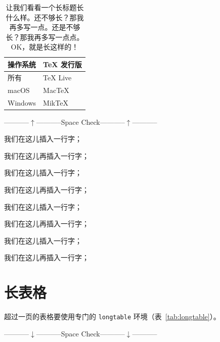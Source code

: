 \begin{table}[!h]
  \centering
  \caption{让我们看看一个长标题长什么样。还不够长？那我再多写一点。还是不够长？那我再多写一点点。OK，就是长这样的！}
  \label{tab:exampletable}
  \begin{tabular}{p{4cm}p{4cm}}
    \toprule
    \multicolumn{1}{c}{\textbf{操作系统}} & \multicolumn{1}{c}{\textbf{TeX 发行版}} \\
    \midrule
    所有 & TeX Live \\
    macOS & MacTeX \\
    Windows & MikTeX \\
    \bottomrule
  \end{tabular}
\end{table}

\centerline{-----------$\uparrow$-----------Space Check-----------$\uparrow$-----------}

我们在这儿插入一行字；

我们在这儿再插入一行字；

我们在这儿插入一行字；

我们在这儿再插入一行字；

我们在这儿插入一行字；

我们在这儿再插入一行字；

我们在这儿插入一行字；

我们在这儿再插入一行字；

\section{长表格}

超过一页的表格要使用专门的 \texttt{longtable} 环境（表~\ref{tab:longtable}）。\\
\centerline{-----------$\downarrow$-----------Space Check-----------$\downarrow$-----------}


